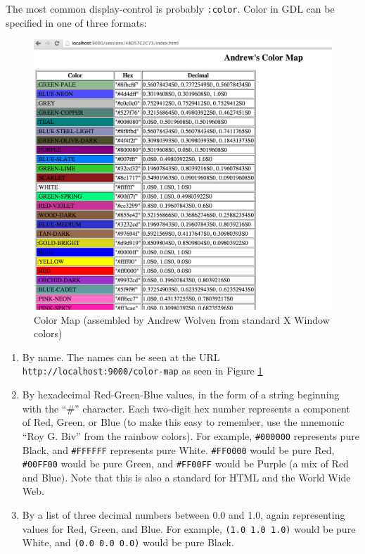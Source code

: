 \documentclass [11pt]{book}
\begin{document}
The most common display-control is probably \texttt{:color}. Color in GDL can be specified in one of three formats:
\begin{figure}
\begin{center}
\includegraphics{../images/color-map.png}
\end{center}

\caption{Color Map (assembled by Andrew
			 Wolven from standard X Window colors)}

\label{fig:color-map}

\end{figure}


\begin{enumerate}

\item By name. The names can be seen at the URL \texttt{http://localhost:9000/color-map} as seen in Figure 
\ref{fig:color-map}

\item By hexadecimal Red-Green-Blue values, in the form of
	  a string beginning with the ``\#'' character. Each two-digit
	  hex number represents a component of Red, Green, or Blue (to
	  make this easy to remember, use the mnemonic ``Roy G. Biv''
	  from the rainbow colors). For example, \texttt{\#000000} represents pure Black, and \texttt{\#FFFFFF} represents pure White. \texttt{\#FF0000} would be pure Red, \texttt{\#00FF00} would be pure Green, and \texttt{\#FF00FF} would be Purple (a mix of Red and Blue). Note that this
	    is also a standard for HTML and the World Wide Web.

\item By a list of three decimal numbers between 0.0 and
	  1.0, again representing values for Red, Green, and Blue. For example, \texttt{(1.0 1.0 1.0)} would be pure White, and \texttt{(0.0 0.0 0.0)} would be pure Black.

\end{enumerate}
\end{document}
